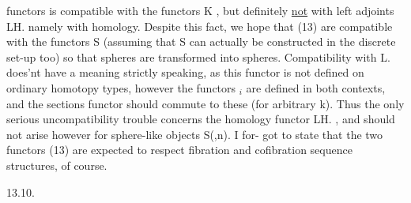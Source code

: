 functors is compatible with the functors K\hand{$\sim$} , but  definitely \uline{not} with  
left adjoints L\hand{$\sim$}H. namely with homology. Despite this fact, we hope  that
 (13) are compatible with the functors S\hand{$\sim$} (assuming that S\hand{$\sim$} can actually
be constructed in the discrete set-up too)\hand{,}  so that spheres are
transformed into spheres. Compatibility with L\hand{$\Pi$}. does'nt have a meaning
strictly speaking, as this functor is not defined on ordinary homotopy
types, however the functors \hand{$\Pi$}$_i$ are defined in both contexts, and the
sections functor should commute to these (for arbitrary k). Thus the
only serious uncompatibility trouble concerns the homology functor LH. ,
 and should not arise however for sphere-like objects S(,n). \xout{-} I for-%
got to state  that the two functors (13) are expected to  respect
fibration and cofibration sequence structures, of course.

13.10.

